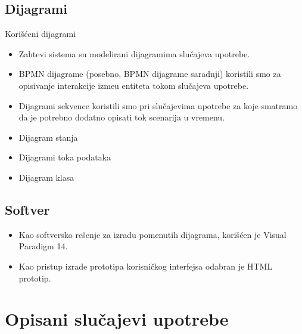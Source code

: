\documentclass[11pt]{beamer}
\begin{document}
\subsection{Dijagrami}
\begin{frame}{Kori\v s\' ceni dijagrami}
	\begin{itemize}
		\item Zahtevi sistema su modelirani dijagramima slu\v cajeva upotrebe.
		\item BPMN dijagrame (posebno, BPMN dijagrame saradnji) koristili smo za opisivanje interakcije izme\dj u entiteta tokom slu\v cajeva upotrebe.
		\item Dijagrami sekvence koristili smo pri slu\v cajevima upotrebe za koje smatramo da je potrebno dodatno opisati tok scenarija u vremenu.
	\end{itemize}
\end{frame}

\begin{frame}
	\begin{itemize}
		\item Dijagram stanja
		\item Dijagrami toka podataka
		\item Dijagram klasa
	\end{itemize}
\end{frame}

\subsection{Softver}
\begin{frame}
	\begin{itemize}
		\item Kao softversko re\v senje za izradu pomenutih dijagrama, kori\v s\' cen je Visual Paradigm 14.
		\item Kao pristup izrade prototipa korisni\v ckog interfejsa odabran je HTML prototip.
	\end{itemize}
\end{frame}

\section{Opisani slu\v cajevi upotrebe}
\end{document}
